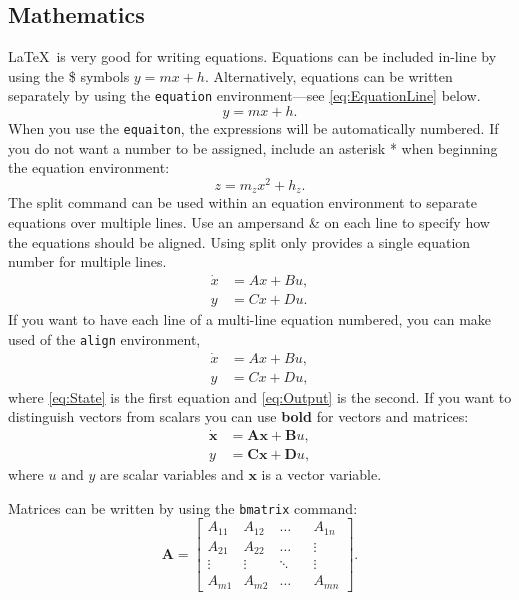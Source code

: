 \documentclass{UoNMCHA}
\numberwithin{equation}{section}
\begin{document}
\subsection{Mathematics}
\LaTeX \ is very good for writing equations. Equations can be included in-line by using the \$ symbols $y=m x + h$. Alternatively, equations can be written separately by using the \verb|equation| environment---see \eqref{eq:EquationLine} below.
\begin{equation}\label{eq:EquationLine}
    y=m x + h.
\end{equation}
When you use the \verb|equaiton|, the expressions will be automatically numbered. If you do not want a number to be assigned, include an asterisk * when beginning the equation environment:
\begin{equation*}
    z=m_z x^2 + h_z.
\end{equation*}
The split command can be used within an equation environment to separate equations over multiple lines. Use an ampersand \& on each line to specify how the equations should be aligned. Using split only provides a single equation number for multiple lines.
\begin{equation}\label{eq:SS1}
    \begin{split}
        \dot x &= Ax + Bu, \\
        y &= Cx + Du.
    \end{split}
\end{equation}
If you want to have each line of a multi-line equation numbered, you can make used of the \verb|align| environment,
\begin{align}
    \dot x &= Ax + Bu,  \label{eq:State} \\
    y &= Cx + Du, \label{eq:Output} 
\end{align}
where \eqref{eq:State} is the first equation and \eqref{eq:Output} is the second. If you want to distinguish vectors from scalars you can use \textbf{bold} for vectors and matrices:
\begin{equation*} 
    \begin{split}
        \dot{\mathbf{x}} &= \mathbf{A} \mathbf{x} + \mathbf{B} u, \\
        y &= \mathbf{C} \mathbf{x} + \mathbf{D} u,
    \end{split}
\end{equation*}
where $u$ and $y$ are scalar variables and $\mathbf{x}$ is a vector variable.

Matrices can be written by using the \verb|bmatrix| command:
\begin{equation*}
    \mathbf{A} =
    \begin{bmatrix}
        A_{11} & A_{12} & \dots & &A_{1n} \\
        A_{21} & A_{22} &  \dots & &\vdots \\
        \vdots & \vdots & \ddots& &  \vdots\\
        A_{m1} & A_{m2} & \dots & &A_{mn}
    \end{bmatrix}.
\end{equation*}
\end{document}
